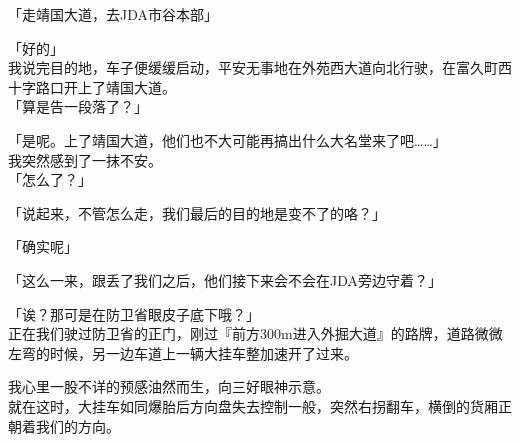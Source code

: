 「走靖国大道，去JDA市谷本部」

「好的」\\

我说完目的地，车子便缓缓启动，平安无事地在外苑西大道向北行驶，在富久町西十字路口开上了靖国大道。\\

「算是告一段落了？」

「是呢。上了靖国大道，他们也不大可能再搞出什么大名堂来了吧……」\\

我突然感到了一抹不安。\\

「怎么了？」

「说起来，不管怎么走，我们最后的目的地是变不了的咯？」

「确实呢」

「这么一来，跟丢了我们之后，他们接下来会不会在JDA旁边守着？」

「诶？那可是在防卫省眼皮子底下哦？」\\

正在我们驶过防卫省的正门，刚过『前方300m进入外掘大道』的路牌，道路微微左弯的时候，另一边车道上一辆大挂车整加速开了过来。

我心里一股不详的预感油然而生，向三好眼神示意。\\

就在这时，大挂车如同爆胎后方向盘失去控制一般，突然右拐翻车，横倒的货厢正朝着我们的方向。

